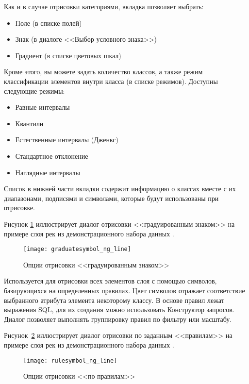Как и в случае отрисовки категориями, вкладка  позволяет выбрать:

\begin{itemize}[label=--]
\item Поле (в списке полей)
\item Знак (в диалоге <<Выбор условного знака>>)
\item Градиент (в списке цветовых шкал)
\end{itemize}

Кроме этого, вы можете задать количество классов, а также режим классификации
элементов внутри класса (в списке режимов). Доступны следующие режимы:
\begin{itemize}
 \item Равные интервалы
 \item Квантили
 \item Естественные интервалы (Дженкс)
 \item Стандартное отклонение
 \item Наглядные интервалы
\end{itemize}

Список в нижней части вкладки  содержит информацию о классах
вместе с их диапазонами, подписями и символами, которые будут использованы
при отрисовке.

Рисунок \ref{fig:gradsymNG} иллюстрирует диалог отрисовки
<<градуированным знаком>> на примере слоя рек из демонстрационного набора
данных \qg.

\begin{figure}[ht]
   \centering
   \texttt{[image: graduatesymbol\_ng\_line]}
   \caption{Опции  отрисовки <<градуированным знаком>> \wincaption}\label{fig:gradsymNG}
\end{figure}


Используется для отрисовки всех элементов слоя с помощью символов,
базирующихся на определенных правилах. Цвет символов отражает
соответствие выбранного атрибута элемента некоторому классу. В основе правил
лежат выражения SQL, для их создания можно использовать Конструктор запросов.
Диалог позволяет выполнять группировку правил по фильтру или масштабу.

Рисунок~\ref{fig:rulesymNG} иллюстрирует диалог отрисовки по заданным
<<правилам>> на примере слоя рек из демонстрационного набора данных \qg.

\begin{figure}[ht]
   \centering
   \texttt{[image: rulesymbol\_ng\_line]}
   \caption{Опции отрисовки <<по правилам>> \wincaption}\label{fig:rulesymNG}
\end{figure}

